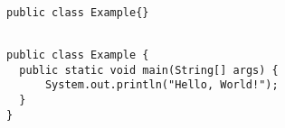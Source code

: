 \lstset{
basicstyle=\ttfamily\small,
language=Java,
xleftmargin=1cm}
\begin{lstlisting}

public class Example{}
\end{lstlisting}
\lstset{
basicstyle=\ttfamily\small,
xleftmargin=1cm}
\begin{lstlisting}

public class Example {
  public static void main(String[] args) {
      System.out.println("Hello, World!");
  }
}
\end{lstlisting}